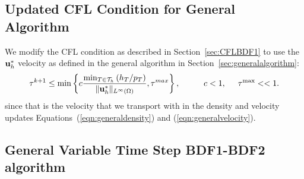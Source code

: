 \documentclass[letterpaper]{erdc}
\begin{document}
\subsection{Updated CFL Condition for General Algorithm}
We modify the CFL condition as described in Section~\ref{sec:CFLBDF1} to use the $\textbf{u}_h^{*}$ velocity as defined in the general algorithm in Section~\ref{sec:generalalgorithm}:
\begin{equation}
  \tau^{k+1} \leq \min \left\{c \frac{\min_{T\in\mathcal{T}_h}\left(h_{T}/p_T\right)}{\|\textbf{u}_h^{*}\|_{L^{\infty}(\Omega)}}, \tau^{max}\right\}, \hspace{1cm} c<1, \hspace{0.5cm}\tau^{\max} << 1.
\end{equation}
since that is the velocity that we transport with in the density and velocity updates Equations~(\ref{eqn:generaldensity}) and (\ref{eqn:generalvelocity}).


%
%  
\subsection{General Variable Time Step BDF1-BDF2 algorithm}\label{sec:generalalgorithmdescription}
\end{document}
